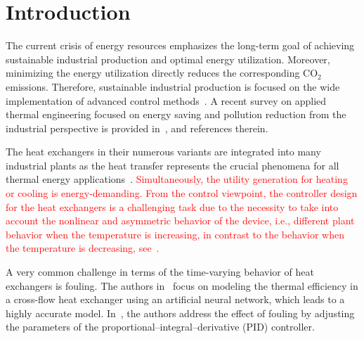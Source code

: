 \documentclass[preprint,12pt]{elsarticle}
\newcommand{\change}[1]{\textcolor{red}{#1}}
\begin{document}
	
	\section{Introduction}
	\label{sec:introduction}
	

	The current crisis of energy resources emphasizes the long-term goal of achieving sustainable industrial production and optimal energy utilization. Moreover, minimizing the energy utilization directly reduces the corresponding CO$_{2}$ emissions. Therefore, sustainable industrial production is focused on the wide implementation of advanced control methods~\cite{MN20}. A recent survey on applied thermal engineering focused on energy saving and pollution reduction from the industrial perspective is provided in~\cite{YV16}, and references therein.
	
	The heat exchangers in their numerous variants are integrated into many industrial plants as the heat transfer represents the crucial phenomena for all thermal energy applications~\cite{KV18}. \change{Simultaneously, the utility generation for heating or cooling is energy-demanding. From the control viewpoint, the controller design for the heat exchangers is a challenging task due to the necessity to take into account the nonlinear and asymmetric behavior of the device, i.e., different plant behavior when the temperature is increasing, in contrast to the behavior when the temperature is decreasing, see~\cite{RL20}.} 
	
	
	A very common challenge in terms of the time-varying behavior of heat exchangers is fouling. The authors in~\cite{AGUEL_fouling} focus on modeling the thermal efficiency in a cross-flow heat exchanger using an artificial neural network, which leads to a highly accurate model. In~\cite{TRAFCZYNSKI_fouling}, the authors address the effect of fouling by adjusting the parameters of the proportional–integral–derivative (PID) controller. 
	
\end{document}
